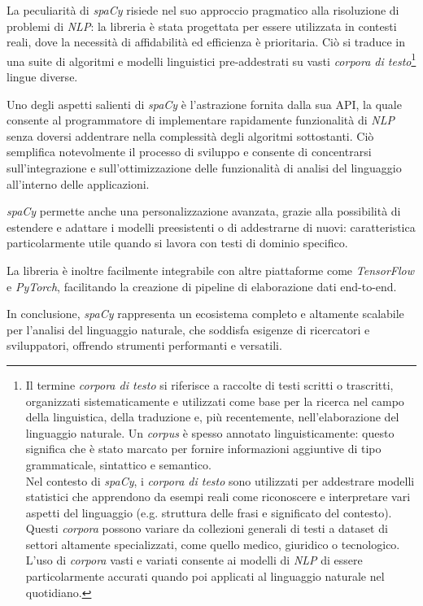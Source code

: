 \documentclass[12pt]{report}
\newcommand{\spacy}{\textsl{spaCy}\xspace}
\newcommand{\nlp}{\textsl{NLP}\xspace}
\newcommand{\api}{\textsf{API}\xspace}
\begin{document}
La peculiarità di \spacy risiede nel suo approccio pragmatico alla risoluzione di problemi di \nlp: la libreria è stata progettata per essere utilizzata in contesti reali, dove la necessità di affidabilità ed efficienza è prioritaria. Ciò si traduce in una suite di algoritmi e modelli linguistici pre-addestrati su vasti \textit{corpora di testo}\footnote{Il termine \textit{corpora di testo} si riferisce a raccolte di testi scritti o trascritti, organizzati sistematicamente e utilizzati come base per la ricerca nel campo della linguistica, della traduzione e, più recentemente, nell'elaborazione del linguaggio naturale. Un \textit{corpus} è spesso annotato linguisticamente: questo significa che è stato marcato per fornire informazioni aggiuntive di tipo grammaticale, sintattico e semantico.\\
Nel contesto di \spacy, i \textit{corpora di testo} sono utilizzati per addestrare modelli statistici che apprendono da esempi reali come riconoscere e interpretare vari aspetti del linguaggio (e.g. struttura delle frasi e significato del contesto). Questi \textit{corpora} possono variare da collezioni generali di testi a dataset di settori altamente specializzati, come quello medico, giuridico o tecnologico. L'uso di \textit{corpora} vasti e variati consente ai modelli di \nlp di essere particolarmente accurati quando poi applicati al linguaggio naturale nel quotidiano.} lingue diverse.

Uno degli aspetti salienti di \spacy è l'astrazione fornita dalla sua \api, la quale consente al programmatore di implementare rapidamente funzionalità di \nlp senza doversi addentrare nella complessità degli algoritmi sottostanti. Ciò semplifica notevolmente il processo di sviluppo e consente di concentrarsi sull'integrazione e sull'ottimizzazione delle funzionalità di analisi del linguaggio all'interno delle applicazioni.

\spacy permette anche una personalizzazione avanzata, grazie alla possibilità di estendere e adattare i modelli preesistenti o di addestrarne di nuovi: caratteristica particolarmente utile quando si lavora con testi di dominio specifico.

La libreria è inoltre facilmente integrabile con altre piattaforme come \textsl{TensorFlow} e \textsl{PyTorch}, facilitando la creazione di pipeline di elaborazione dati end-to-end.

In conclusione, \spacy rappresenta un ecosistema completo e altamente scalabile per l'analisi del linguaggio naturale, che soddisfa esigenze di ricercatori e sviluppatori, offrendo strumenti performanti e versatili.
\end{document}
